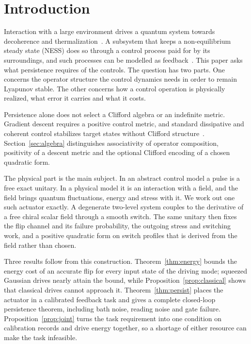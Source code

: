 \documentclass[aps,pre,onecolumn,superscriptaddress,floatfix,longbibliography]{revtex4-2}
\begin{document}
\section{Introduction}
\label{sec:intro}

Interaction with a large environment drives a quantum system towards decoherence and thermalization~\cite{Breuer2002,Weiss2012}. A subsystem that keeps a non-equilibrium steady state (NESS) does so through a control process paid for by its surroundings, and such processes can be modelled as feedback~\cite{Seifert2012,Jarzynski2011,Sagawa2012,Parrondo2015}. This paper asks what persistence requires of the controls. The question has two parts. One concerns the operator structure the control dynamics needs in order to remain Lyapunov stable. The other concerns how a control operation is physically realized, what error it carries and what it costs.

Persistence alone does not select a Clifford algebra or an indefinite metric. Gradient descent requires a positive control metric, and standard dissipative and coherent control stabilizes target states without Clifford structure~\cite{Verstraete2009,Diehl2008,TicozziViola2008,Mirrahimi2005}. Section~\ref{sec:algebra} distinguishes associativity of operator composition, positivity of a descent metric and the optional Clifford encoding of a chosen quadratic form.

The physical part is the main subject. In an abstract control model a pulse is a free exact unitary. In a physical model it is an interaction with a field, and the field brings quantum fluctuations, energy and stress with it. We work out one such actuator exactly. A degenerate two-level system couples to the derivative of a free chiral scalar field through a smooth switch. The same unitary then fixes the flip channel and its failure probability, the outgoing stress and switching work, and a positive quadratic form on switch profiles that is derived from the field rather than chosen.

Three results follow from this construction. Theorem~\ref{thm:energy} bounds the energy cost of an accurate flip for every input state of the driving mode; squeezed Gaussian drives nearly attain the bound, while Proposition~\ref{prop:classical} shows that classical drives cannot approach it. Theorem~\ref{thm:persist} places the actuator in a calibrated feedback task and gives a complete closed-loop persistence theorem, including bath noise, reading noise and gate failure. Proposition~\ref{prop:joint} turns the task requirement into one condition on calibration records and drive energy together, so a shortage of either resource can make the task infeasible.
\end{document}
